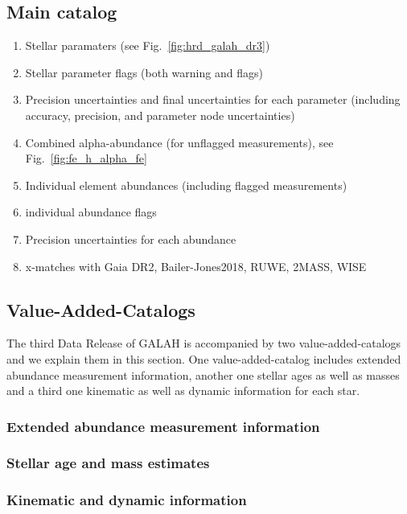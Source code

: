 \documentclass[fleqn,usenatbib,useAMS]{mnras}
\begin{document}
\subsection{Main catalog} \label{sec:main_catalog}
\begin{enumerate}
\item Stellar paramaters (see Fig.~\ref{fig:hrd_galah_dr3})
\item Stellar parameter flags (both warning and flags)
\item Precision uncertainties and final uncertainties for each parameter (including accuracy, precision, and parameter node uncertainties)
\item Combined alpha-abundance (for unflagged measurements), see Fig.~\ref{fig:fe_h_alpha_fe}
\item Individual element abundances (including flagged measurements)
\item individual abundance flags
\item Precision uncertainties for each abundance
\item x-matches with Gaia DR2, Bailer-Jones2018, RUWE, 2MASS, WISE
\end{enumerate}

\subsection{Value-Added-Catalogs} \label{sec:value_added_catalogs}

The third Data Release of GALAH is accompanied by two value-added-catalogs and we explain them in this section. One value-added-catalog includes extended abundance measurement information, another one stellar ages as well as masses and a third one kinematic as well as dynamic information for each star.

\subsubsection{Extended abundance measurement information}

\subsubsection{Stellar age and mass estimates}

\subsubsection{Kinematic and dynamic information}
\end{document}

